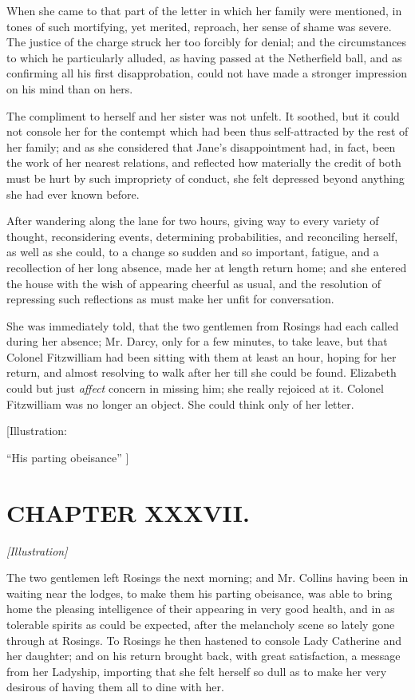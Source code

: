 \documentclass[12pt]{book}
\begin{document}
When she came to that part of the letter in which her family were mentioned, in tones of such mortifying, yet merited, reproach, her sense of shame was severe. The justice of the charge struck her too forcibly for denial; and the circumstances to which he particularly alluded, as having passed at the Netherfield ball, and as confirming all his first disapprobation, could not have made a stronger impression on his mind than on hers.

The compliment to herself and her sister was not unfelt. It soothed, but it could not console her for the contempt which had been thus self-attracted by the rest of her family; and as she considered that Jane's disappointment had, in fact, been the work of her nearest relations, and reflected how materially the credit of both must be hurt by such impropriety of conduct, she felt depressed beyond anything she had ever known before.

After wandering along the lane for two hours, giving way to every variety of thought, reconsidering events, determining probabilities, and reconciling herself, as well as she could, to a change so sudden and so important, fatigue, and a recollection of her long absence, made her at length return home; and she entered the house with the wish of appearing cheerful as usual, and the resolution of repressing such reflections as must make her unfit for conversation.

She was immediately told, that the two gentlemen from Rosings had each called during her absence; Mr. Darcy, only for a few minutes, to take leave, but that Colonel Fitzwilliam had been sitting with them at least an hour, hoping for her return, and almost resolving to walk after her till she could be found. Elizabeth could but just \textit{affect} concern in missing him; she really rejoiced at it. Colonel Fitzwilliam was no longer an object. She could think only of her letter.

[Illustration:

``His parting obeisance'' ]

\chapter{CHAPTER XXXVII.}

\emph{[Illustration]}

The two gentlemen left Rosings the next morning; and Mr. Collins having been in waiting near the lodges, to make them his parting obeisance, was able to bring home the pleasing intelligence of their appearing in very good health, and in as tolerable spirits as could be expected, after the melancholy scene so lately gone through at Rosings. To Rosings he then hastened to console Lady Catherine and her daughter; and on his return brought back, with great satisfaction, a message from her Ladyship, importing that she felt herself so dull as to make her very desirous of having them all to dine with her.
\end{document}

